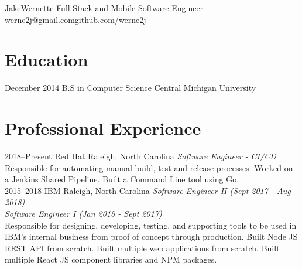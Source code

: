 \documentclass[]{friggeri-cv} %
\begin{document}
\header
{Jake}{Wernette}
{Full Stack and Mobile Software Engineer}
{werne2j@gmail.com\space\space\space\space\space\space github.com/werne2j}




\section{Education}

\begin{entrylist}
\entry
{December 2014}
{B.S in Computer Science{\normalfont}}
{Central Michigan University}

\end{entrylist}


\section{Professional Experience}

\begin{entrylist}
\entry
{2018--Present}
{Red Hat}
{Raleigh, North Carolina}
{\emph{Software Engineer - CI/CD} \\
Responsible for automating manual build, test and release processes. Worked on a Jenkins Shared Pipeline. Built a Command Line tool using Go. }\\

\entry
{2015--2018}
{IBM}
{Raleigh, North Carolina}
{\emph{Software Engineer II (Sept 2017 - Aug 2018)} \\
\emph{Software Engineer I (Jan 2015 - Sept 2017)} \\
Responsible for designing, developing, testing, and supporting tools to be used in IBM's internal business from proof of concept through production.
Built Node JS REST API from scratch. Built multiple web applications from scratch. Built multiple React JS component libraries and NPM packages.}\\

\end{entrylist}
\end{document}

